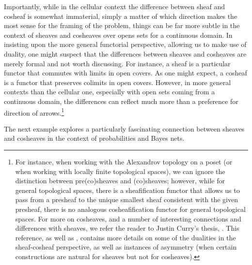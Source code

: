 \documentclass[a4paper]{book}
\theoremstyle{definition}
\theoremstyle{definition}
\theoremstyle{definition}
\theoremstyle{theorem}
\theoremstyle{definition}
\begin{document}
Importantly, while in the cellular context the difference between sheaf and cosheaf is somewhat immaterial, simply a matter of which direction makes the most sense for the framing of the problem, things can be far more subtle in the context of sheaves and cosheaves over opens sets for a continuous domain. In insisting upon the more general functorial perspective, allowing us to make use of duality, one might suspect that the differences between sheaves and cosheaves are merely formal and not worth discussing. For instance, a sheaf is a particular functor that commutes with limits in open covers. As one might expect, a cosheaf is a functor that preserves colimits in open covers. However, in more general contexts than the cellular one, especially with open sets coming from a continuous domain, the differences can reflect much more than a preference for direction of arrows.\footnote{For instance, when working with the Alexandrov topology on a poset (or when working with locally finite topological spaces), we can ignore the distinction between pre(co)sheaves and (co)sheaves; however, while for general topological spaces, there is a sheafification functor that allows us to pass from a presheaf to the unique smallest sheaf consistent with the given presheaf, there is no analogous cosheafification functor for general topological spaces. For more on cosheaves, and a number of interesting connections and differences with sheaves, we refer the reader to Justin Curry's thesis, \cite{curry_sheaves_2013}. This reference, as well as \cite{robinson_sheaf_2016}, contains more details on some of the dualities in the sheaf-cosheaf perspective, as well as instances of asymmetry (when certain constructions are natural for sheaves but not for cosheaves).} \par   
The next example explores a particularly fascinating connection between sheaves and cosheaves in the context of probabilities and Bayes nets.   
\end{document}
